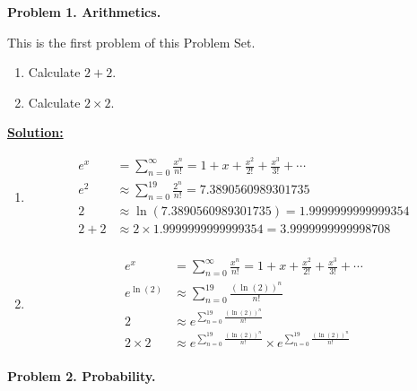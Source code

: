 \documentclass[11pt]{article}
\def\blue{\color{blue}}
\def\pb#1{{\blue\bf Problem #1.}\vskip 1pt}
\def\sol{\underline{\textbf{Solution:}}\hskip 4pt}
\begin{document}
\large

\pb{1. Arithmetics}

This is the first problem of this Problem Set.
\begin{enumerate}[label=(\alph*)]
\item Calculate $2+2$.

\item Calculate $2 \times 2$.
\end{enumerate}

\sol

\begin{enumerate}[label=(\alph*)]
\item

\begin{align*}
e^x &= \sum_{n=0}^{\infty} \frac{x^n}{n!} = 1 + x + \frac{x^2}{2!} + \frac{x^3}{3!} + \cdots \\
e^2 &\approx \sum_{n=0}^{19} \frac{2^n}{n!} = 7.3890560989301735 \\
2 &\approx \ln(7.3890560989301735) = 1.9999999999999354 \\
2 + 2 &\approx 2 \times 1.9999999999999354 = 3.9999999999998708 \\
\end{align*}

\item

\begin{align*}
e^x &= \sum_{n=0}^{\infty} \frac{x^n}{n!} = 1 + x + \frac{x^2}{2!} + \frac{x^3}{3!} + \cdots \\
e^{\ln(2)} &\approx \sum_{n=0}^{19} \frac{(\ln(2))^n}{n!} \\
2 &\approx e^{\sum_{n=0}^{19} \frac{(\ln(2))^n}{n!}} \\
2 \times 2 &\approx e^{\sum_{n=0}^{19} \frac{(\ln(2))^n}{n!}} \times e^{\sum_{n=0}^{19} \frac{(\ln(2))^n}{n!}} \\
\end{align*}

\end{enumerate}

\pb{2. Probability}
\end{document}
